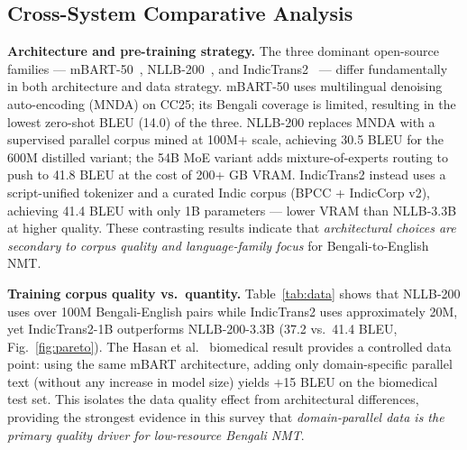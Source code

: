 \documentclass[conference]{IEEEtran}
\begin{document}
\subsection{Cross-System Comparative Analysis}
\label{subsec:crosssystem}

\textbf{Architecture and pre-training strategy.}
The three dominant open-source families --- mBART-50~\cite{liu2020mbart50},
NLLB-200~\cite{nllb2022}, and IndicTrans2~\cite{gala2023indictrans2} --- differ
fundamentally in both architecture and data strategy.
mBART-50 uses multilingual denoising auto-encoding (MNDA) on CC25; its Bengali
coverage is limited, resulting in the lowest zero-shot BLEU (14.0) of the three.
NLLB-200 replaces MNDA with a supervised parallel corpus mined at 100M+ scale,
achieving 30.5 BLEU for the 600M distilled variant; the 54B MoE variant adds
mixture-of-experts routing to push to 41.8 BLEU at the cost of 200+ GB VRAM.
IndicTrans2 instead uses a script-unified tokenizer and a curated Indic corpus
(BPCC + IndicCorp v2), achieving 41.4 BLEU with only 1B parameters --- lower
VRAM than NLLB-3.3B at higher quality.
These contrasting results indicate that \textit{architectural choices are secondary
to corpus quality and language-family focus} for Bengali-to-English NMT.

\textbf{Training corpus quality vs.\ quantity.}
Table~\ref{tab:data} shows that NLLB-200 uses over 100M Bengali-English pairs
while IndicTrans2 uses approximately 20M, yet IndicTrans2-1B outperforms
NLLB-200-3.3B (37.2 vs.\ 41.4 BLEU, Fig.~\ref{fig:pareto}).
The Hasan et al.~\cite{hasan2020low} biomedical result provides a controlled
data point: using the same mBART architecture, adding only domain-specific
parallel text (without any increase in model size) yields $+$15 BLEU on the
biomedical test set.
This isolates the data quality effect from architectural differences, providing
the strongest evidence in this survey that \textit{domain-parallel data is the
primary quality driver for low-resource Bengali NMT}.
\end{document}
